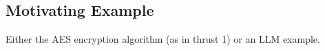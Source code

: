 \subsection{Motivating Example}
Either the AES encryption algorithm (as in thrust 1) or an LLM example.




